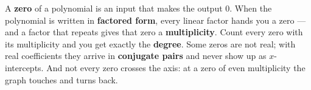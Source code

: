 \documentclass[10pt]{article}
\begin{document}
\vspace{0.14in}

\begin{remindbox}
\small
A \textbf{zero} of a polynomial is an input that makes the output 0. When the polynomial is
written in \textbf{factored form}, every linear factor hands you a zero --- and a factor that
repeats gives that zero a \textbf{multiplicity}. Count every zero with its multiplicity and you
get exactly the \textbf{degree}. Some zeros are not real; with real coefficients they arrive in
\textbf{conjugate pairs} and never show up as $x$-intercepts. And not every zero crosses the
axis: at a zero of even multiplicity the graph touches and turns back.
\end{remindbox}
\end{document}
